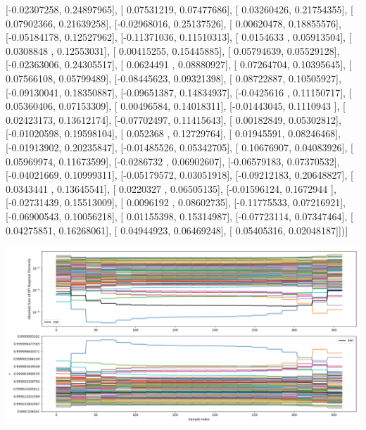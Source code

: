 \documentclass{article}
\begin{document}
       [-0.02307258,  0.24897965],
       [ 0.07531219,  0.07477686],
       [ 0.03260426,  0.21754355],
       [ 0.07902366,  0.21639258],
       [-0.02968016,  0.25137526],
       [ 0.00620478,  0.18855576],
       [-0.05184178,  0.12527962],
       [-0.11371036,  0.11510313],
       [ 0.0154633 ,  0.05913504],
       [ 0.0308848 ,  0.12553031],
       [ 0.00415255,  0.15445885],
       [ 0.05794639,  0.05529128],
       [-0.02363006,  0.24305517],
       [ 0.0624491 ,  0.08880927],
       [ 0.07264704,  0.10395645],
       [ 0.07566108,  0.05799489],
       [-0.08445623,  0.09321398],
       [ 0.08722887,  0.10505927],
       [-0.09130041,  0.18350887],
       [-0.09651387,  0.14834937],
       [-0.0425616 ,  0.11150717],
       [ 0.05360406,  0.07153309],
       [ 0.00496584,  0.14018311],
       [-0.01443045,  0.1110943 ],
       [ 0.02423173,  0.13612174],
       [-0.07702497,  0.11415643],
       [ 0.00182849,  0.05302812],
       [-0.01020598,  0.19598104],
       [ 0.052368  ,  0.12729764],
       [ 0.01945591,  0.08246468],
       [-0.01913902,  0.20235847],
       [-0.01485526,  0.05342705],
       [ 0.10676907,  0.04083926],
       [ 0.05969974,  0.11673599],
       [-0.0286732 ,  0.06902607],
       [-0.06579183,  0.07370532],
       [-0.04021669,  0.10999311],
       [-0.05179572,  0.03051918],
       [-0.09212183,  0.20648827],
       [ 0.0343441 ,  0.13645541],
       [ 0.0220327 ,  0.06505135],
       [-0.01596124,  0.1672944 ],
       [-0.02731439,  0.15513009],
       [ 0.0096192 ,  0.08602735],
       [-0.11775533,  0.07216921],
       [-0.06900543,  0.10056218],
       [ 0.01155398,  0.15314987],
       [-0.07723114,  0.07347464],
       [ 0.04275851,  0.16268061],
       [ 0.04944923,  0.06469248],
       [ 0.05405316,  0.02048187]])]
\begin{center}
\includegraphics[scale=.9]{report_pickled_controls118/control_dpn_all.png}

\end{center}
\end{document}
